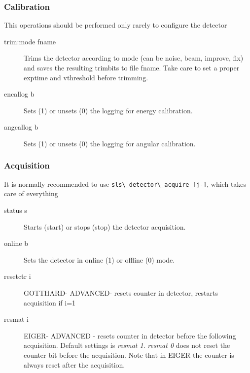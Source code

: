 \documentclass{article}
\newcommand{\E}{EIGER\xspace}
\begin{document}
\subsubsection{Calibration}
This operations should be performed only rarely to configure the detector

\begin{description}
  \item[trim:mode fname] Trims the detector according to mode (can be noise, beam, improve, fix) and saves the resulting trimbits to file fname. Take care to set a proper exptime and vthreshold before trimming. 
  \item[encallog b] Sets (1) or unsets (0) the logging for energy calibration.
  \item[angcallog b] Sets (1) or unsets (0) the logging for angular calibration.
\end{description}




\subsubsection{Acquisition}

It is normally recommended to use \verb=sls\_detector\_acquire [j-]=, which takes care of everything
\begin{description}
\item[status s] Starts (start) or stops (stop) the detector acquisition.   
\item[online b] Sets the detector in online (1) or offline (0) mode.  
\item[resetctr i] GOTTHARD- ADVANCED- resets counter in detector, restarts acquisition if i=1
\item[resmat i] \E - ADVANCED - resets counter in detector before the following acquisition. Default settings is \textit{resmat 1}. \textit{resmat 0} does not reset the counter bit before the acquisition. Note that in \E the counter is always reset after the acquisition.
\end{description}
\end{document}
